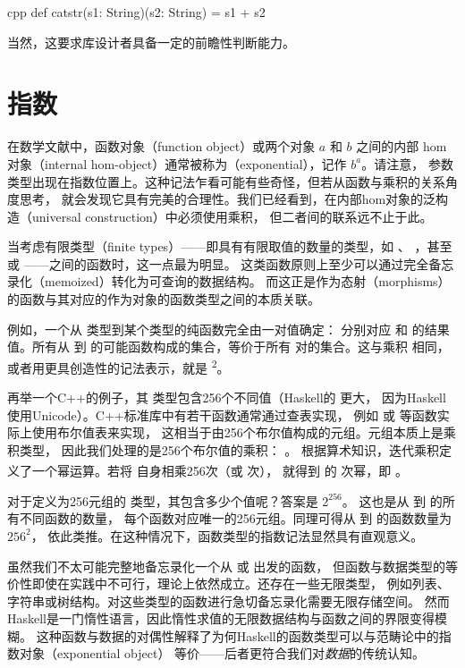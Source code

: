 \begin{snip}{cpp}
def catstr(s1: String)(s2: String) = s1 + s2
\end{snip}
当然，这要求库设计者具备一定的前瞻性判断能力。

\section{指数}

在数学文献中，函数对象（function object）或两个对象 $a$ 和 $b$ 之间的内部
hom对象（internal hom-object）通常被称为（exponential），记作 $b^{a}$。请注意，
参数类型出现在指数位置上。这种记法乍看可能有些奇怪，但若从函数与乘积的关系角度思考，
就会发现它具有完美的合理性。我们已经看到，在内部hom对象的泛构造（universal construction）中必须使用乘积，
但二者间的联系远不止于此。

当考虑有限类型（finite types）——即具有有限取值的数量的类型，如 、
，甚至  或 ——之间的函数时，这一点最为明显。
这类函数原则上至少可以通过完全备忘录化（memoized）转化为可查询的数据结构。
而这正是作为态射（morphisms）的函数与其对应的作为对象的函数类型之间的本质关联。

例如，一个从  类型到某个类型的纯函数完全由一对值确定：
分别对应  和  的结果值。所有从  到 
的可能函数构成的集合，等价于所有  对的集合。这与乘积  \times{} 
相同，或者用更具创造性的记法表示，就是 \textsuperscript{2}。

再举一个C++的例子，其  类型包含256个不同值（Haskell的  更大，
因为Haskell使用Unicode）。C++标准库中有若干函数通常通过查表实现，
例如  或  等函数实际上使用布尔值表来实现，
这相当于由256个布尔值构成的元组。元组本质上是乘积类型，
因此我们处理的是256个布尔值的乘积：
。
根据算术知识，迭代乘积定义了一个幂运算。若将  自身相乘256次（或  次），
就得到  的  次幂，即 \textsuperscript{}。

对于定义为256元组的  类型，其包含多少个值呢？答案是 $2^{256}$。
这也是从  到  的所有不同函数的数量，
每个函数对应唯一的256元组。同理可得从  到  的函数数量为 $256^{2}$，
依此类推。在这种情况下，函数类型的指数记法显然具有直观意义。

虽然我们不太可能完整地备忘录化一个从  或  出发的函数，
但函数与数据类型的等价性即使在实践中不可行，理论上依然成立。还存在一些无限类型，
例如列表、字符串或树结构。对这些类型的函数进行急切备忘录化需要无限存储空间。
然而Haskell是一门惰性语言，因此惰性求值的无限数据结构与函数之间的界限变得模糊。
这种函数与数据的对偶性解释了为何Haskell的函数类型可以与范畴论中的指数对象（exponential object）
等价——后者更符合我们对\emph{数据}的传统认知。

